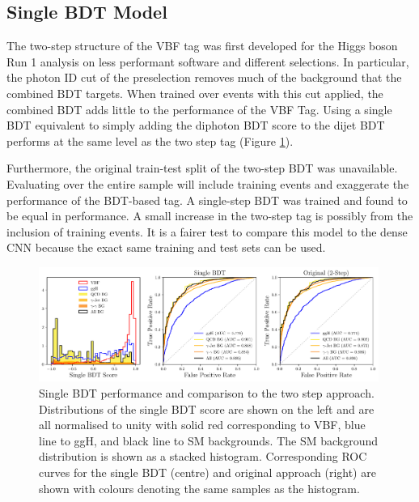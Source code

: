 \subsection{Single BDT Model}
The two-step structure of the VBF tag was first developed for the Higgs boson Run 1 analysis  on less performant software and different selections. 
In particular, the photon ID cut of the preselection removes much of the background that the combined BDT targets. 
When trained over events with this cut applied, the combined BDT adds little to the performance of the VBF Tag. 
Using a single BDT equivalent to simply adding the diphoton BDT score to the dijet BDT performs at the same level as the two step tag (Figure \ref{fig:event_categorisation:single_BDT}).

Furthermore, the original train-test split of the two-step BDT was unavailable. Evaluating over the entire sample will include training events and exaggerate the performance of the BDT-based tag. 
A single-step BDT was trained and found to be equal in performance. A small increase in the two-step tag is possibly from the inclusion of training events. 
It is a fairer test to compare this model to the dense CNN because the exact same training and test sets can be used. 
\begin{figure}[h!]
    \centering
    \includegraphics[width=0.99\textwidth]{figures/event_selection/dijet_BDT_PS_unw.pdf}
    \caption{Single BDT performance and comparison to the two step approach. Distributions of the single BDT score are shown on the left and are all normalised to unity with solid red corresponding to VBF, blue line to ggH, and black line to SM backgrounds. The SM background distribution is shown as a stacked histogram. Corresponding ROC curves for the single BDT (centre) and original approach (right) are shown with colours denoting the same samples as the histogram.}
    \label{fig:event_categorisation:single_BDT}
\end{figure}

















